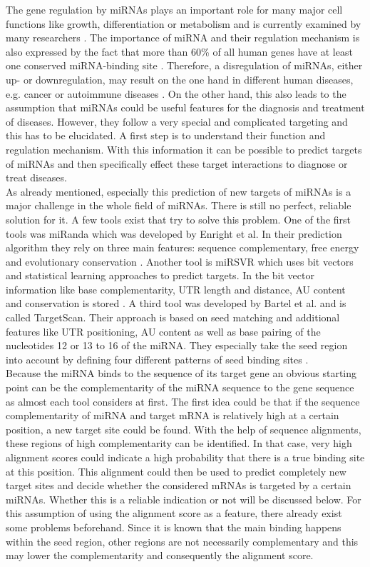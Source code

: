 \documentclass[12pt,  a4paper]{report}
\begin{document}
The gene regulation by miRNAs plays an important role for many major cell functions like growth, differentiation or metabolism and is currently examined by many researchers \cite{Ardekani}. The importance of miRNA and their regulation mechanism is also expressed by the fact that more than 60\% of all human genes have at least one conserved miRNA-binding site \cite{Friedman}. Therefore, a disregulation of miRNAs, either up- or downregulation, may result on the one hand in different human diseases, e.g. cancer or autoimmune diseases \cite{Ardekani}. On the other hand, this also leads to the assumption that miRNAs could be useful features for the diagnosis and treatment of diseases. However, they follow a very special and complicated targeting and this has to be elucidated. A first step is to understand their function and regulation mechanism. With this information it can be possible to predict targets of miRNAs and then specifically effect these target interactions to diagnose or treat diseases. \\
As already mentioned, especially this prediction of new targets of miRNAs is a major challenge in the whole field of miRNAs. There is still no perfect, reliable solution for it. A few tools exist that try to solve this problem. One of the first tools was miRanda which was developed by Enright et al. In their prediction algorithm they rely on three main features: sequence complementary, free energy and evolutionary conservation \cite{Enright}. Another tool is miRSVR which uses bit vectors and statistical learning approaches to predict targets. In the bit vector information like base complementarity, UTR length and distance, AU content and conservation is stored \cite{Betel}. A third tool was developed by Bartel et al. and is called TargetScan. Their approach is based on seed matching and additional features like UTR positioning, AU content as well as base pairing of the nucleotides 12 or 13 to 16 of the miRNA. They especially take the seed region into account by defining four different patterns of seed binding sites \cite{Lewis}.\\

Because the miRNA binds to the sequence of its target gene an obvious starting point can be the complementarity of the miRNA sequence to the gene sequence as almost each tool considers at first. The first idea could be that if the sequence complementarity of miRNA and target mRNA is relatively high at a certain position, a new target site could be found. With the help of sequence alignments, these regions of high complementarity can be identified. In that case, very high alignment scores could indicate a high probability that there is a true binding site at this position. This alignment could then be used to predict completely new target sites and decide whether the considered mRNAs is targeted by a certain miRNAs. Whether this is a reliable indication or not will be discussed below. For this assumption of using the alignment score as a feature, there already exist some problems beforehand. Since it is known that the main binding happens within the seed region, other regions are not necessarily complementary and this may lower the complementarity and consequently the alignment score. \\
\end{document}
